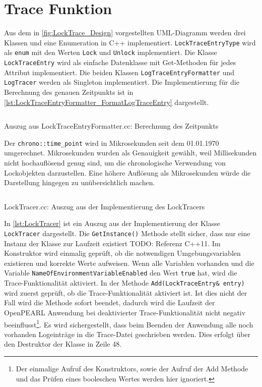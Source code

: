 \section{Trace Funktion}
\label{section:Implementierung:Trace Funktion}
Aus dem in \cref{fig:LockTrace_Design} vorgestellten UML-Diagramm werden drei
Klassen und eine Enumeration in C++ implementiert.
\texttt{Lock\-Trace\-Entry\-Type} wird als \texttt{enum} mit den Werten
\texttt{Lock} und \texttt{Unlock} implementiert. Die Klasse
\texttt{LockTraceEntry} wird als einfache Datenklasse mit Get-Methoden für jedes
Attribut implementiert. Die beiden Klassen \texttt{Log\-Trace\-Entry\-Formatter}
und \texttt{LogTracer} werden als Singleton implementiert. Die Implementierung
für die Berechnung des genauen Zeitpunkts ist in
\cref{lst:LockTraceEntryFormatter_FormatLogTraceEntry} dargestellt.

\begin{listing}[ht]
  \inputminted[frame=lines,linenos,firstline=31,lastline=33]{cpp}{./cpp/LockTraceEntryFormatter.cc}
  \caption{Auszug aus LockTraceEntryFormatter.cc: Berechnung des Zeitpunkts}
  \label{lst:LockTraceEntryFormatter_FormatLogTraceEntry}   
\end{listing}

Der \texttt{chrono::time\_point} wird in Mikrosekunden seit dem 01.01.1970
umgerechnet. Mikrosekunden wurden als Genauigkeit gewählt, weil Millisekunden
nicht hochauflösend genug sind, um die chronologische Verwendung von
Lockobjekten darzustellen. Eine höhere Auflösung als Mikrosekunden würde die
Darstellung hingegen zu unübersichtlich machen.

\begin{listing}[ht]
  \inputminted[frame=lines,linenos,firstline=11,lastline=54]{cpp}{./cpp/LockTracer.cc}
  \caption{LockTracer.cc: Auszug aus der Implementierung des LockTracers}
  \label{lst:LockTracer}
\end{listing}

In \cref{lst:LockTracer} ist ein Auszug aus der Implementierung der Klasse
\texttt{LockTracer} dargestellt. Die \texttt{GetInstance()} Methode stellt
sicher, dass nur eine Instanz der Klasse zur Laufzeit existiert TODO: Referenz
C++11. Im Konstruktor wird einmalig geprüft, ob die notwendigen
Umgebungsvariablen existieren und korrekte Werte aufweisen. Wenn alle Variablen
vorhanden und die Variable \texttt{Name\-Of\-Environment\-Variable\-Enabled} den
Wert \texttt{true} hat, wird die Trace-Funktionalität aktiviert. In der Methode
\texttt{Add(Lock\-Trace\-Entry\& entry)} wird zuerst geprüft, ob die
Trace-Funktionalität aktiviert ist. Ist dies nicht der Fall wird die Methode
sofort beendet, dadurch wird die Laufzeit der OpenPEARL Anwendung bei
deaktivierter Trace-Funktionalität nicht negativ beeinflusst\footnote{Der
einmalige Aufruf des Konstruktors, sowie der Aufruf der Add Methode und das
Prüfen eines booleschen Wertes werden hier ignoriert.}. Es wird sichergestellt,
dass beim Beenden der Anwendung alle noch vorhanden Logeinträge in die
Trace-Datei geschrieben werden. Dies erfolgt über den Destruktor der Klasse in
Zeile 48.

